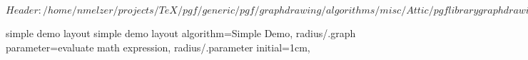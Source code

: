 %
%
%

\ProvidesFileRCS[v\pgfversion] $Header: /home/nmelzer/projects/TeX/pgf/generic/pgf/graphdrawing/algorithms/misc/Attic/pgflibrarygraphdrawing.misc.code.tex,v 1.4 2012/04/03 21:17:55 tantau Exp $



%
%
\pgfgddeclarealgorithmkey
  {simple demo layout}
  {simple demo layout}
  {
    algorithm=Simple Demo,
    radius/.graph parameter=evaluate math expression,
    radius/.parameter initial=1cm,
  }



\endinput